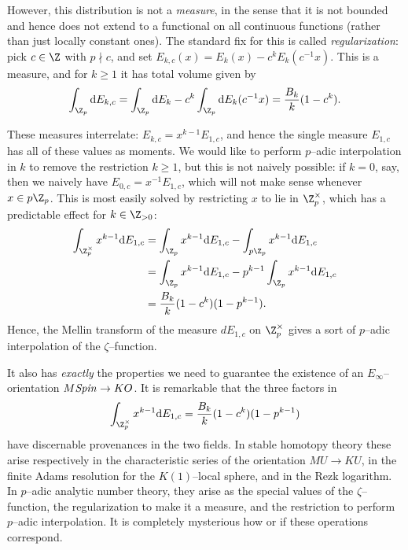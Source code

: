 However, this distribution is not a \emph{measure}, in the sense that it is not bounded and hence does not extend to a functional on all continuous functions (rather than just locally constant ones).  The standard fix for this is called \textit{regularization}: pick \(c \in \Z\) with \(p \nmid c\), and set \(E_{k,c}(x) = E_k(x) - c^kE_k(c^{-1}x)\).  This is a measure, and for \(k \ge 1\) it has total volume given by \[\int_{\Z_p} \mathrm dE_{k,c} = \int_{\Z_p} \mathrm dE_k - c^k \int_{\Z_p} \mathrm dE_k(c^{-1}x) = \frac{B_k}{k}(1 - c^k).\]

These measures interrelate: \(E_{k, c} = x^{k-1} E_{1, c}\), and hence the single measure \(E_{1, c}\) has all of these values as moments.  We would like to perform \(p\)--adic interpolation in \(k\) to remove the restriction \(k \ge 1\), but this is not naively possible: if \(k = 0\), say, then we naively have \(E_{0, c} = x^{-1} E_{1, c}\), which will not make sense whenever \(x \in p\Z_p\).  This is most easily solved by restricting \(x\) to lie in \(\Z_p^\times\), which has a predictable effect for \(k \in \Z_{> 0}\):
\begin{align*}
\int_{\Z_p^\times} x^{k-1} \mathrm dE_{1,c} & = \int_{\Z_p} x^{k-1} \mathrm dE_{1,c} - \int_{p\Z_p} x^{k-1} \mathrm dE_{1, c} \\
& = \int_{\Z_p} x^{k-1} \mathrm dE_{1,c} - p^{k-1} \int_{\Z_p} x^{k-1} \mathrm dE_{1, c} \\
& = \frac{B_k}{k}(1 - c^k)(1 - p^{k-1}).
\end{align*}
Hence, the Mellin transform of the measure \(dE_{1,c}\) on \(\Z_p^\times\) gives a sort of \(p\)--adic interpolation of the \(\zeta\)--function.

It also has \emph{exactly} the properties we need to guarantee the existence of an \(E_\infty\)--orientation \(M\mathit{Spin} \to KO\).  It is remarkable that the three factors in \[\int_{\Z_p^\times} x^{k-1} \mathrm d E_{1, c} = \frac{B_k}{k} (1 - c^k)(1 - p^{k-1})\] have discernable provenances in the two fields.  In stable homotopy theory these arise respectively in the characteristic series of the orientation \(MU \to KU\), in the finite Adams resolution for the \(K(1)\)--local sphere, and in the Rezk logarithm.  In \(p\)--adic analytic number theory, they arise as the special values of the \(\zeta\)--function, the regularization to make it a measure, and the restriction to perform \(p\)--adic interpolation.  It is completely mysterious how or if these operations correspond.


